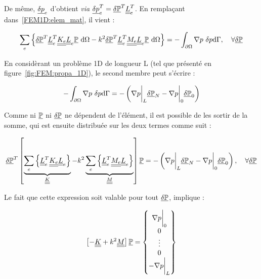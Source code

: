 De même, $\ul{\DP}_e$ d'obtient \textit{via} $\ul{\DP}_e^T = \GDP^T\uul{L}_e^T$. En remplaçant dans~\eqref{FEM1D:elem_mat}, il
vient :

\begin{equation}
    \sum_e \left\{
	\GDP^T\uul{L}_e^T\uul{K_e}\uul{L}_e\GP~\dd\Omega - k^2 \GDP^T\uul{L}_e^T\uul{M_e}\uul{L}_e\GP~\dd\Omega \right\}
	= -\int_{\partial\Omega}\nabla p~\DP\dd\Gamma, \quad \forall\GDP\label{FEM1D:post_boolean}
\end{equation}

\pagebreak

En considèrant un problème 1D de longueur L (tel que présenté en figure~\ref{fig:FEM:propa_1D}), le second membre
peut s'écrire :

$$-\int_{\partial\Omega}\nabla p~\DP\dd\Gamma = -\left(\nabla p\bigg|_L\GDP_N- \nabla p\bigg|_0\GDP_0\right)$$

Comme ni $\GP$ ni $\GDP$ ne dépendent de l'élément, il est possible de les sortir de la somme, qui est ensuite
distribuée sur les deux termes comme suit :

\begin{equation*}
	\GDP^T\left[\underbrace{\sum_e \left\{ \uul{L}_e^T\uul{K_e}\uul{L}_e\right\}}_{\uul{K}}
	- k^2 \underbrace{\sum_e\left\{\uul{L}_e^T\uul{M_e}\uul{L}_e\right\}}_{\uul{M}}\right]\GP
	= -\left(\nabla p\bigg|_L\GDP_N- \nabla p\bigg|_0\GDP_0\right), \quad \forall\GDP
\end{equation*}

Le fait que cette expression soit valable pour tout $\GDP$, implique :

\begin{equation}
\left[- \uul{K} + k^2\uul{M}\right]\GP = \begin{Bmatrix} \nabla p\bigg|_0\\0\\\vdots\\0\\-\nabla p\bigg|_L\end{Bmatrix} \label{FEM1D:final}
\end{equation}
